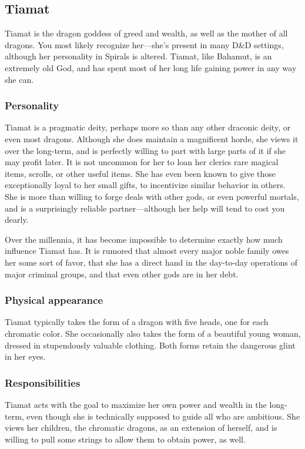 \subsection*{Tiamat}
\begin{goddesc}
\end{goddesc}

Tiamat is the dragon goddess of greed and wealth, as well as the mother of all dragons.
You most likely recognize her---she's present in many D\&D settings, although her personality in Spirals is  altered.
Tiamat, like Bahamut, is an extremely old God, and has spent most of her long life gaining power in any way she can.

\subsubsection*{Personality}
Tiamat is a pragmatic deity, perhaps more so than any other draconic deity, or even most dragons.
Although she does maintain a magnificent horde, she views it over the long-term, and is perfectly willing to part with large parts of it if she may profit later.
It is not uncommon for her to loan her clerics rare magical items, scrolls, or other useful items.
She has even been known to give those exceptionally loyal to her small gifts, to incentivize similar behavior in others.
She is more than willing to forge deals with other gods, or even powerful mortals, and is a surprisingly reliable partner---although her help will tend to cost you dearly.

Over the millennia, it has become impossible to determine exactly how much influence Tiamat has.
It is rumored that almost every major noble family owes her some sort of favor, that she has a direct hand in the day-to-day operations of major criminal groups, and that even other gods are in her debt.
\subsubsection*{Physical appearance}
Tiamat typically takes the form of a dragon with five heads, one for each chromatic color.
She occasionally also takes the form of a beautiful young woman, dressed in stupendously valuable clothing.
Both forms retain the dangerous glint in her eyes.

\subsubsection*{Responsibilities}
Tiamat acts with the goal to maximize her own power and wealth in the long-term, even though she is technically supposed to guide all who are ambitious.
She views her children, the chromatic dragons, as an extension of herself, and is willing to pull some strings to allow them to obtain power, as well.

